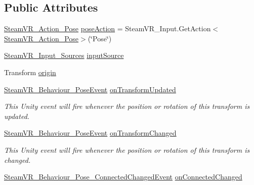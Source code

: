 \subsection*{Public Attributes}
\begin{DoxyCompactItemize}
\item 
\mbox{\hyperlink{class_valve_1_1_v_r_1_1_steam_v_r___action___pose}{Steam\+V\+R\+\_\+\+Action\+\_\+\+Pose}} \mbox{\hyperlink{class_valve_1_1_v_r_1_1_steam_v_r___behaviour___pose_a7d8dfcf694264e0a7bc878bee6eaa30b}{pose\+Action}} = Steam\+V\+R\+\_\+\+Input.\+Get\+Action$<$\mbox{\hyperlink{class_valve_1_1_v_r_1_1_steam_v_r___action___pose}{Steam\+V\+R\+\_\+\+Action\+\_\+\+Pose}}$>$(\char`\"{}Pose\char`\"{})
\item 
\mbox{\hyperlink{namespace_valve_1_1_v_r_a82e5bf501cc3aa155444ee3f0662853f}{Steam\+V\+R\+\_\+\+Input\+\_\+\+Sources}} \mbox{\hyperlink{class_valve_1_1_v_r_1_1_steam_v_r___behaviour___pose_a95ff5e8947fe7780543e4c5679cfba52}{input\+Source}}
\item 
Transform \mbox{\hyperlink{class_valve_1_1_v_r_1_1_steam_v_r___behaviour___pose_a59ea726c397c04757378717e6bf5a8a7}{origin}}
\item 
\mbox{\hyperlink{class_valve_1_1_v_r_1_1_steam_v_r___behaviour___pose_event}{Steam\+V\+R\+\_\+\+Behaviour\+\_\+\+Pose\+Event}} \mbox{\hyperlink{class_valve_1_1_v_r_1_1_steam_v_r___behaviour___pose_aa26155c725bb61edaebcf529645c77c4}{on\+Transform\+Updated}}
\begin{DoxyCompactList}\small\item\em This Unity event will fire whenever the position or rotation of this transform is updated. \end{DoxyCompactList}\item 
\mbox{\hyperlink{class_valve_1_1_v_r_1_1_steam_v_r___behaviour___pose_event}{Steam\+V\+R\+\_\+\+Behaviour\+\_\+\+Pose\+Event}} \mbox{\hyperlink{class_valve_1_1_v_r_1_1_steam_v_r___behaviour___pose_a1d23c9fc3364bc8d9a2e2047af2e2e92}{on\+Transform\+Changed}}
\begin{DoxyCompactList}\small\item\em This Unity event will fire whenever the position or rotation of this transform is changed. \end{DoxyCompactList}\item 
\mbox{\hyperlink{class_valve_1_1_v_r_1_1_steam_v_r___behaviour___pose___connected_changed_event}{Steam\+V\+R\+\_\+\+Behaviour\+\_\+\+Pose\+\_\+\+Connected\+Changed\+Event}} \mbox{\hyperlink{class_valve_1_1_v_r_1_1_steam_v_r___behaviour___pose_a5cb65c8eacdd57472f5c6e3d11302391}{on\+Connected\+Changed}}

\end{DoxyCompactItemize}
